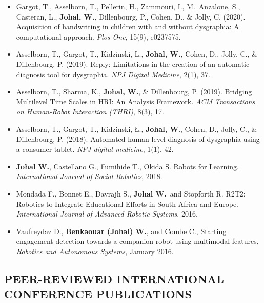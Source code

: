 \begin{itemize}[nosep]
    \item Gargot, T., Asselborn, T., Pellerin, H., Zammouri, I., M.\ Anzalone, S., Casteran, L., \textbf{Johal, W.}, Dillenbourg, P., Cohen, D., \& Jolly, C. (2020). Acquisition of handwriting in children with and without dysgraphia: A computational approach. \textit{Plos One}, 15(9), e0237575.

    \item Asselborn, T., Gargot, T., Kidzinski, L., \textbf{Johal, W.}, Cohen, D., Jolly, C., \& Dillenbourg, P. (2019). Reply: Limitations in the creation of an automatic diagnosis tool for dysgraphia. \textit{NPJ Digital Medicine}, 2(1), 37.

    \item Asselborn, T., Sharma, K., \textbf{Johal, W.}, \& Dillenbourg, P. (2019). Bridging Multilevel Time Scales in HRI: An Analysis Framework. \textit{ACM Transactions on Human-Robot Interaction (THRI)}, 8(3), 17.

    \item Asselborn, T., Gargot, T., Kidzinski, Ł., \textbf{Johal, W}., Cohen, D., Jolly, C., \& Dillenbourg, P. (2018). Automated human-level diagnosis of dysgraphia using a consumer tablet. \textit{NPJ digital medicine}, 1(1), 42.

    \item \textbf{Johal W.}, Castellano G., Fumihide T., Okida S. Robots for Learning. \textit{International Journal of Social Robotics}, 2018.

    \item Mondada F., Bonnet E., Davrajh S., \textbf{Johal W.}\ and Stopforth R. R2T2: Robotics to Integrate Educational Efforts in South Africa and Europe. \textit{International Journal of Advanced Robotic Systems}, 2016.

    \item Vaufreydaz D., \textbf{Benkaouar (Johal) W.}, and Combe C., Starting engagement detection towards a companion robot using multimodal features, \textit{Robotics and Autonomous Systems}, January 2016.
\end{itemize}

\vspace{0.1in}

\subsection{PEER-REVIEWED INTERNATIONAL CONFERENCE PUBLICATIONS}
\vspace{2pt}

